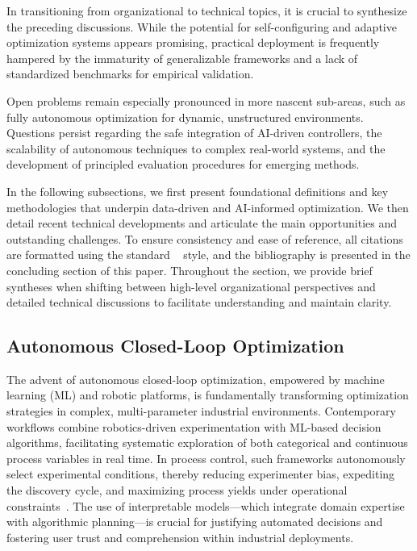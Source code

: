 \documentclass[sigconf]{acmart}
\begin{document}
In transitioning from organizational to technical topics, it is crucial to synthesize the preceding discussions. While the potential for self-configuring and adaptive optimization systems appears promising, practical deployment is frequently hampered by the immaturity of generalizable frameworks and a lack of standardized benchmarks for empirical validation.

Open problems remain especially pronounced in more nascent sub-areas, such as fully autonomous optimization for dynamic, unstructured environments. Questions persist regarding the safe integration of AI-driven controllers, the scalability of autonomous techniques to complex real-world systems, and the development of principled evaluation procedures for emerging methods.

In the following subsections, we first present foundational definitions and key methodologies that underpin data-driven and AI-informed optimization. We then detail recent technical developments and articulate the main opportunities and outstanding challenges. To ensure consistency and ease of reference, all citations are formatted using the standard ~\cite{} style, and the bibliography is presented in the concluding section of this paper. Throughout the section, we provide brief syntheses when shifting between high-level organizational perspectives and detailed technical discussions to facilitate understanding and maintain clarity.

\subsection{Autonomous Closed-Loop Optimization}

The advent of autonomous closed-loop optimization, empowered by machine learning (ML) and robotic platforms, is fundamentally transforming optimization strategies in complex, multi-parameter industrial environments. Contemporary workflows combine robotics-driven experimentation with ML-based decision algorithms, facilitating systematic exploration of both categorical and continuous process variables in real time. In process control, such frameworks autonomously select experimental conditions, thereby reducing experimenter bias, expediting the discovery cycle, and maximizing process yields under operational constraints~\cite{ref79}. The use of interpretable models—which integrate domain expertise with algorithmic planning—is crucial for justifying automated decisions and fostering user trust and comprehension within industrial deployments.
\end{document}
